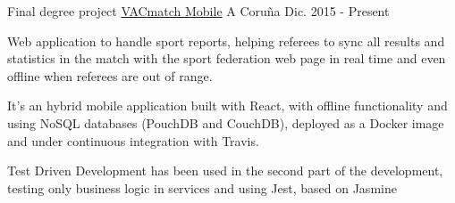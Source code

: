 


\begin{cventries}


\cventry
{Final degree project} %
{\href{https://github.com/vacmatch/vacmatch-mobile}{VACmatch Mobile}} %
{A Coruña} %
{Dic. 2015 - Present} %
{ %
\begin{cvitems}
\item {Web application to handle sport reports, helping referees to sync all 
results and statistics in the match with the sport federation web page in 
real time and even offline when referees are out of range.}
\item {It's an hybrid mobile application built with React, with offline 
functionality and using NoSQL databases (PouchDB and CouchDB), deployed as a 
Docker image and under continuous integration with Travis.}
\item {Test Driven Development has been used in the second part of the 
development, testing only business logic in services and using Jest, based 
on Jasmine}
\end{cvitems}
}


\end{cventries}